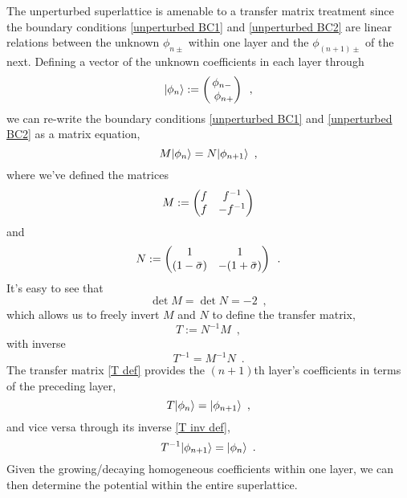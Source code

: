 \documentclass{article}
\begin{document}
The unperturbed superlattice is amenable to a transfer matrix treatment since the boundary conditions \eqref{unperturbed BC1} and \eqref{unperturbed BC2} are linear relations between the unknown $\phi_{n\pm}$ within one layer and the $\phi_{(n+1)\pm}$ of the next.  Defining a vector of the unknown coefficients in each layer through
\begin{equation}
    \label{phi vec def}
    \lvert\phi_n\rangle:=\begin{pmatrix}
    \phi_{n-}
    \\\
    \phi_{n+}
    \end{pmatrix}
    \,\,\,,
\end{equation}
we can re-write the boundary conditions \eqref{unperturbed BC1} and \eqref{unperturbed BC2} as a matrix equation,
\begin{equation}
    \label{matrix BC}
    M\lvert\phi_n\rangle= N\lvert\phi_{n+1}\rangle
    \,\,\,,
\end{equation}
where we've defined the matrices
\begin{equation}
    \label{M def}
    M:=\begin{pmatrix}
    f & f^{-1}
    \\
    f & -f^{-1}
    \end{pmatrix}
\end{equation}
and
\begin{equation}
    \label{N def}
    N:=
    \begin{pmatrix}
    1 & 1
    \\
    (1-\bar\sigma) & -(1+\bar \sigma)
    \end{pmatrix}
    \,\,\,.
\end{equation}
It's easy to see that 
\begin{equation}
    \label{M and N det}
    \det M = \det N = -2
    \,\,\,,
\end{equation}
which allows us to freely invert $M$ and $N$ to define the transfer matrix,
\begin{equation}
    \label{T def}
    T:= N^{-1} M
    \,\,\,,
\end{equation}
with inverse
\begin{equation}
    \label{T inv def}
    T^{-1} = M^{-1} N
    \,\,\,.
\end{equation}
The transfer matrix \eqref{T def} provides the $(n+1)$th layer's coefficients in terms of the preceding layer,
\begin{equation}
    \label{T action}
    T\lvert\phi_n\rangle = \lvert\phi_{n+1}\rangle
    \,\,\,,
\end{equation}
and vice versa through its inverse \eqref{T inv def},
\begin{equation}
    \label{T inv action}
    T^{-1}\lvert\phi_{n+1}\rangle = \lvert\phi_n\rangle
    \,\,\,.
\end{equation}
Given the growing/decaying homogeneous coefficients within one layer, we can then determine the potential within the entire superlattice.
\end{document}
